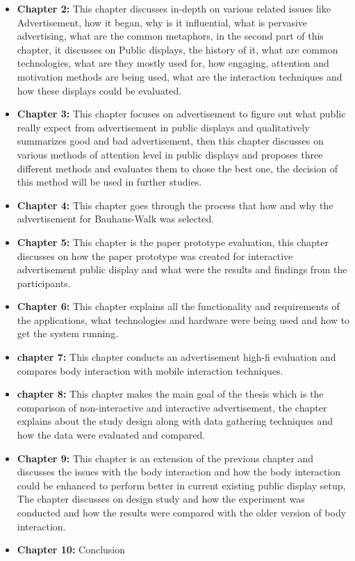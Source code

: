 \begin{itemize}
\item \textbf{Chapter 2:}
 This chapter discusses in-depth on various related issues like Advertisement, how it began, why is it influential, what is pervasive advertising, what are the common metaphors, in the second part of this chapter, it discusses on Public displays, the history of it, what are common technologies, what are they mostly used for, how engaging, attention and motivation methods are being used, what are the interaction techniques and how these displays could be evaluated.


\item \textbf{Chapter 3:}
This chapter focuses on advertisement to figure out what public really expect from advertisement in public displays and qualitatively summarizes good and bad advertisement, then this chapter discusses on various methods of attention level in public displays and proposes three different methods and evaluates them to chose the best one, the decision of this method will be used in further studies.


\item \textbf{Chapter 4:}
This chapter goes through the process that how and why the advertisement for Bauhaus-Walk was selected.


\item \textbf{Chapter 5:}
This chapter is the paper prototype evaluation, this chapter discusses on how the paper prototype was created for interactive advertisement public display and what were the results and findings from the participants. 


\item \textbf{Chapter 6:}
This chapter explains all the functionality and requirements of the applications, what technologies and hardware were being used and how to get the system running.


\item \textbf{chapter 7:}
This chapter conducts an advertisement high-fi evaluation and compares body interaction with mobile interaction techniques.


\item \textbf{chapter 8:}
This chapter makes the main goal of the thesis which is the comparison of non-interactive and interactive advertisement, the chapter explains about the study design along with data gathering techniques and how the data were evaluated and compared.


\item \textbf{Chapter 9:}
This chapter is an extension of the previous chapter and discusses the issues with the body interaction and how the body interaction could be enhanced to perform better in current existing public display setup, The chapter discusses on design study and how the experiment was conducted and how the results were compared with the older version of body interaction. 


\item \textbf{Chapter 10:}
Conclusion

\end{itemize}

